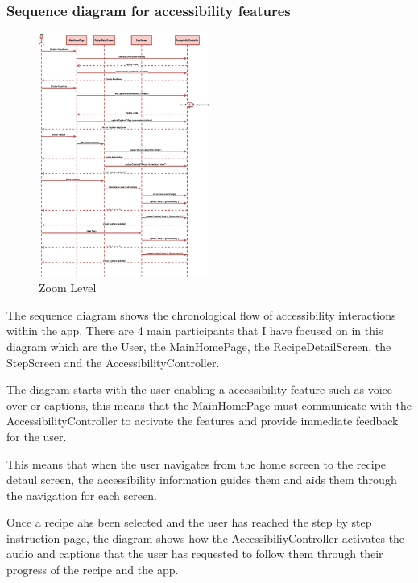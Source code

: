 \documentclass[]{project_final}
\begin{document}
\newpage

\subsubsection{Sequence diagram for accessibility features}
\begin{figure}[ht!]
    \centering
    \includegraphics[width=0.5\textwidth]{accessibilityfeaturesSequence.png}
    \vspace*{0.0cm}
    \caption{Zoom Level}
    \label{fig:1}
\end{figure}

The sequence diagram shows the chronological flow of accessibility interactions within the app. There are 4 main participants that I have focused on in this diagram which are the User, the MainHomePage, the RecipeDetailScreen, the StepScreen and the AccessibilityController.

The diagram starts with the user enabling a accessibility feature such as voice over or captions, this means that the MainHomePage must communicate with the AccessibilityController to activate the features and provide immediate feedback for the user.

This means that when the user navigates from the home screen to the recipe detaul screen, the accessibility information guides them and aids them through the navigation for each screen.

Once a recipe ahs been selected and the user has reached the step by step instruction page, the diagram shows how the AccessibiliyController activates the audio and captions that the user has requested to follow them through their progress of the recipe and the app.
\end{document}
